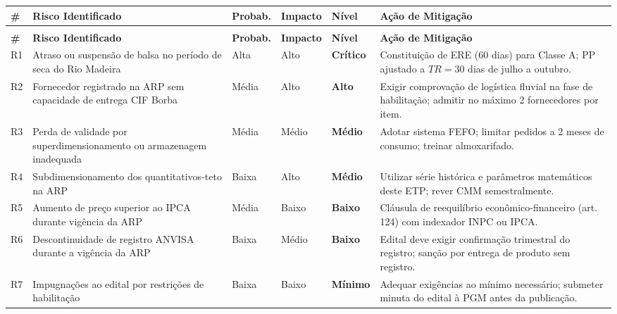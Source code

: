 \documentclass[12pt,a4paper]{article}
\newcommand{\art}[1]{art.\,#1}
\begin{document}
\begin{longtable}{>{\centering\arraybackslash}p{0.4cm}p{3.8cm}>{\centering\arraybackslash}p{1.2cm}%
  >{\centering\arraybackslash}p{1.2cm}>{\centering\arraybackslash}p{1.2cm}p{4.5cm}}
  \rowcolor{navyblue}
  \color{white}\textbf{\#} &
  \color{white}\textbf{Risco Identificado} &
  \color{white}\textbf{Probab.} &
  \color{white}\textbf{Impacto} &
  \color{white}\textbf{Nível} &
  \color{white}\textbf{Ação de Mitigação} \\
  \toprule
  \endfirsthead
  \multicolumn{6}{l}{\footnotesize\textit{(continuação)}} \\
  \rowcolor{navyblue}
  \color{white}\textbf{\#} &
  \color{white}\textbf{Risco Identificado} &
  \color{white}\textbf{Probab.} &
  \color{white}\textbf{Impacto} &
  \color{white}\textbf{Nível} &
  \color{white}\textbf{Ação de Mitigação} \\
  \toprule
  \endhead
  \bottomrule
  \endlastfoot
  \rowcolor{rowalt}
  R1 & Atraso ou suspensão de balsa no período de seca do Rio Madeira &
    Alta & Alto & \textbf{\color{red}Crítico} &
    Constituição de ERE (60 dias) para Classe A; PP ajustado a $TR = 30$ dias de
    julho a outubro. \\
  R2 & Fornecedor registrado na ARP sem capacidade de entrega CIF Borba &
    Média & Alto & \textbf{\color{orange}Alto} &
    Exigir comprovação de logística fluvial na fase de habilitação; admitir
    no máximo 2 fornecedores por item. \\
  \rowcolor{rowalt}
  R3 & Perda de validade por superdimensionamento ou armazenagem inadequada &
    Média & Médio & \textbf{\color{orange}Médio} &
    Adotar sistema FEFO; limitar pedidos a 2 meses de consumo; treinar
    almoxarifado. \\
  R4 & Subdimensionamento dos quantitativos-teto na ARP &
    Baixa & Alto & \textbf{\color{orange}Médio} &
    Utilizar série histórica e parâmetros matemáticos deste ETP; rever CMM
    semestralmente. \\
  \rowcolor{rowalt}
  R5 & Aumento de preço superior ao IPCA durante vigência da ARP &
    Média & Baixo & \textbf{\color{blue}Baixo} &
    Cláusula de reequilíbrio econômico-financeiro (\art{124}) com indexador
    INPC ou IPCA. \\
  R6 & Descontinuidade de registro ANVISA durante a vigência da ARP &
    Baixa & Médio & \textbf{\color{blue}Baixo} &
    Edital deve exigir confirmação trimestral do registro; sanção por entrega
    de produto sem registro. \\
  \rowcolor{rowalt}
  R7 & Impugnações ao edital por restrições de habilitação &
    Baixa & Baixo & \textbf{\color{gray}Mínimo} &
    Adequar exigências ao mínimo necessário; submeter minuta do edital à
    PGM antes da publicação. \\
\end{longtable}
\end{document}
